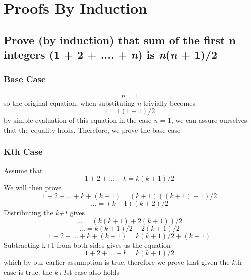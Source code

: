 \documentclass[titlepage]{article}
\numberwithin{equation}{subsection}
\begin{document}
\section{Proofs By Induction}
\subsection{Prove (by induction) that sum of 
the first n integers (1 + 2 + .... + \textit{n}) is \textit{n}(\textit{n} + 1)/2 }
\subsubsection{Base Case}
\begin{equation}
    n = 1
\end{equation}
so the original equation, when substituting \textit{n} trivially becomes
\begin{equation}
    1 = 1(1 + 1) / 2
\end{equation}
by simple evaluation of this equation in the case \textit{n} = 1, we can assure ourselves
that the equality holds. Therefore, we prove the base case

\subsubsection{Kth Case}
Assume that
\begin{equation}
    1 + 2 + ... + k = k(k + 1)/ 2
\end{equation}
We will then prove
\begin{equation}
    1 + 2 + ... + k + (k+1) = (k+1)((k+1)+1)/2
\end{equation}
\begin{equation}
    ... = (k+1)(k+2)/2
\end{equation}
Distributing the \textit{k+1} gives
\begin{equation}
    ... = (k(k+1) + 2(k+1))/2
\end{equation}
\begin{equation}
    ... = k(k+1)/2 + 2(k+1)/2
\end{equation}
\begin{equation}
    1 + 2 + ... + k + (k+1) = k(k+1)/2 + (k+1)
\end{equation}
Subtracting k+1 from both sides gives us the equation
\begin{equation}
    1 + 2 + ... + k = k(k+1)/2
\end{equation}
which by our earlier assumption is true, therefore we prove
that given the \textit{k}th case is true, the \textit{k+1}st case also holds
\end{document}
